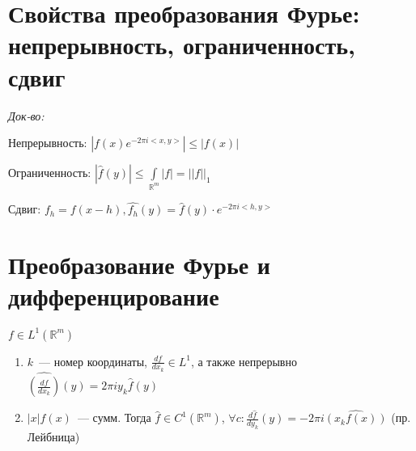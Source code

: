 \documentclass[paper=a4, fontsize=14pt]{report}
\begin{document}
\section{Свойства преобразования Фурье: непрерывность, ограниченность, сдвиг}

\emph{Док-во:}

Непрерывность: $|f(x) e^{-2 \pi i <x, y>}| \leqslant |f(x)|$

Ограниченность: $|\widehat{f}(y)| \leqslant \int\limits_{\mathds{R}^m} |f| = ||f||_1$

Сдвиг: $f_h = f(x - h), \widehat{f_h}(y) = \widehat{f}(y) \cdot e^{-2 \pi i <h, y>}$




\section{Преобразование Фурье и дифференцирование}

$f \in L^1(\mathds{R}^m)$
\begin{enumerate}
	\item $k$~--- номер координаты, $\frac{df}{dx_k} \in L^1$, а также непрерывно $ \widehat{(\frac{df}{dx_k})}(y) = 2\pi i y_k \hat{f}(y)$
	\item $|x|f(x)$~--- сумм. Тогда $\hat{f} \in C^1(\mathds{R}^m)$, $\forall c : \frac{d\hat{f}}{dy_k}(y) = -2\pi i \widehat{(x_k f(x))}$ (пр. Лейбница)
\end{enumerate}
\end{document}
